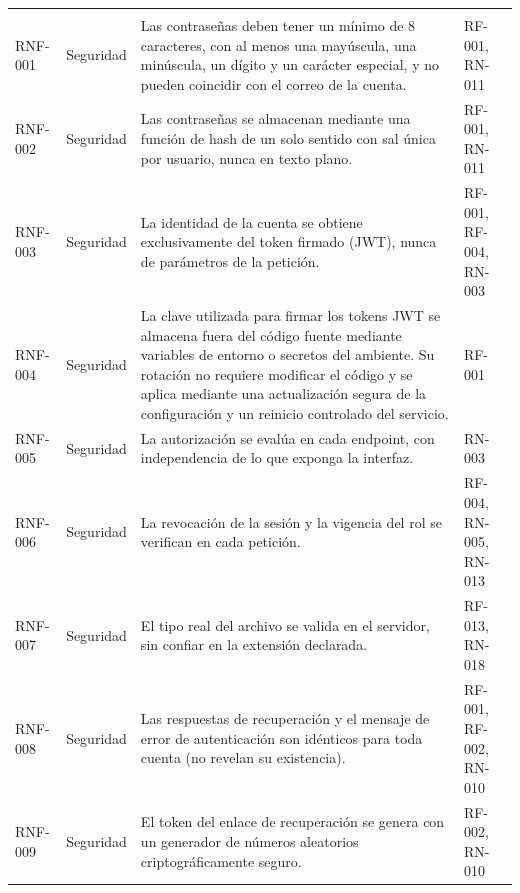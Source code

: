\begin{longtable}{|C{1.7cm}|L{2.9cm}|L{6.4cm}|L{3.4cm}|}
\hline
{} &  &  &  \\
\hline
\endfirsthead
\hline
{} &  &  &  \\
\hline
\endhead
RNF-001 & Seguridad & Las contraseñas deben tener un mínimo de 8 caracteres, con al menos una mayúscula, una minúscula, un dígito y un carácter especial, y no pueden coincidir con el correo de la cuenta. & RF-001, RN-011 \\
\hline
RNF-002 & Seguridad & Las contraseñas se almacenan mediante una función de hash de un solo sentido con sal única por usuario, nunca en texto plano. & RF-001, RN-011 \\
\hline
RNF-003 & Seguridad & La identidad de la cuenta se obtiene exclusivamente del token firmado (JWT), nunca de parámetros de la petición. & RF-001, RF-004, RN-003 \\
\hline
RNF-004 & Seguridad & La clave utilizada para firmar los tokens JWT se almacena fuera del código fuente mediante variables de entorno o secretos del ambiente. Su rotación no requiere modificar el código y se aplica mediante una actualización segura de la configuración y un reinicio controlado del servicio. & RF-001 \\
\hline
RNF-005 & Seguridad & La autorización se evalúa en cada endpoint, con independencia de lo que exponga la interfaz. & RN-003 \\
\hline
RNF-006 & Seguridad & La revocación de la sesión y la vigencia del rol se verifican en cada petición. & RF-004, RN-005, RN-013 \\
\hline
RNF-007 & Seguridad & El tipo real del archivo se valida en el servidor, sin confiar en la extensión declarada. & RF-013, RN-018 \\
\hline
RNF-008 & Seguridad & Las respuestas de recuperación y el mensaje de error de autenticación son idénticos para toda cuenta (no revelan su existencia). & RF-001, RF-002, RN-010 \\
\hline
RNF-009 & Seguridad & El token del enlace de recuperación se genera con un generador de números aleatorios criptográficamente seguro. & RF-002, RN-010 \\

\end{longtable}
